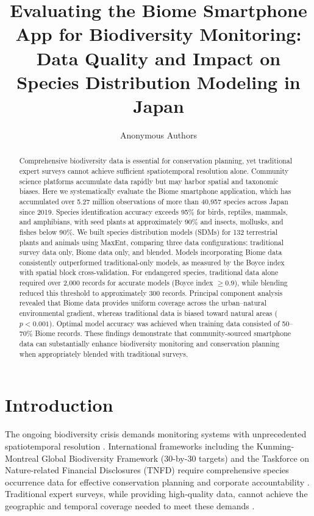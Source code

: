 \documentclass[11pt]{article}
\title{Evaluating the Biome Smartphone App for Biodiversity Monitoring: Data Quality and Impact on Species Distribution Modeling in Japan}
\author{Anonymous Authors}
\date{}
\begin{document}
\maketitle

\begin{abstract}
Comprehensive biodiversity data is essential for conservation planning, yet traditional expert surveys cannot achieve sufficient spatiotemporal resolution alone. Community science platforms accumulate data rapidly but may harbor spatial and taxonomic biases. Here we systematically evaluate the Biome smartphone application, which has accumulated over 5.27 million observations of more than 40,957 species across Japan since 2019. Species identification accuracy exceeds 95\% for birds, reptiles, mammals, and amphibians, with seed plants at approximately 90\% and insects, mollusks, and fishes below 90\%. We built species distribution models (SDMs) for 132 terrestrial plants and animals using MaxEnt, comparing three data configurations: traditional survey data only, Biome data only, and blended. Models incorporating Biome data consistently outperformed traditional-only models, as measured by the Boyce index with spatial block cross-validation. For endangered species, traditional data alone required over 2,000 records for accurate models (Boyce index $\geq 0.9$), while blending reduced this threshold to approximately 300 records. Principal component analysis revealed that Biome data provides uniform coverage across the urban--natural environmental gradient, whereas traditional data is biased toward natural areas ($p < 0.001$). Optimal model accuracy was achieved when training data consisted of 50--70\% Biome records. These findings demonstrate that community-sourced smartphone data can substantially enhance biodiversity monitoring and conservation planning when appropriately blended with traditional surveys.
\end{abstract}

\section{Introduction}

The ongoing biodiversity crisis demands monitoring systems with unprecedented spatiotemporal resolution \citep{hochkirch2021framework}. International frameworks including the Kunming-Montreal Global Biodiversity Framework (30-by-30 targets) and the Taskforce on Nature-related Financial Disclosures (TNFD) require comprehensive species occurrence data for effective conservation planning and corporate accountability \citep{cbd2022framework, tnfd2023recommendations}. Traditional expert surveys, while providing high-quality data, cannot achieve the geographic and temporal coverage needed to meet these demands \citep{chandler2017contribution}.
\end{document}
